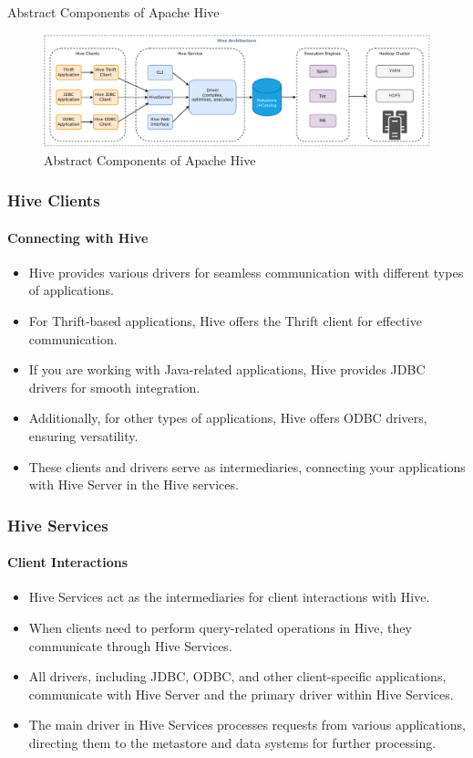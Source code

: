 \begin{frame}{Abstract Components of Apache Hive}
	\begin{figure}
		\includegraphics[width=\textwidth,height=\textheight,keepaspectratio]{./Figures/chapter-03/Hive_Architecture.pdf}	
		\caption{Abstract Components of Apache Hive}
	\end{figure}
\end{frame}
\begin{frame}
\frametitle{Hive Clients}
	\framesubtitle{Connecting with Hive}
	
	\begin{itemize}
	  \item Hive provides various drivers for seamless communication with different types of applications.
	  \item For Thrift-based applications, Hive offers the Thrift client for effective communication.
	  \item If you are working with Java-related applications, Hive provides JDBC drivers for smooth integration.
	  \item Additionally, for other types of applications, Hive offers ODBC drivers, ensuring versatility.
	  \item These clients and drivers serve as intermediaries, connecting your applications with Hive Server in the Hive services.
	\end{itemize}
	
	\end{frame}
\begin{frame}
	\frametitle{Hive Services}
	\framesubtitle{Client Interactions}
	
	\begin{itemize}
	  \item Hive Services act as the intermediaries for client interactions with Hive.
	  \item When clients need to perform query-related operations in Hive, they communicate through Hive Services.
	  \item All drivers, including JDBC, ODBC, and other client-specific applications, communicate with Hive Server and the primary driver within Hive Services.
	  \item The main driver in Hive Services processes requests from various applications, directing them to the metastore and data systems for further processing.
	\end{itemize}
	
	\end{frame}

